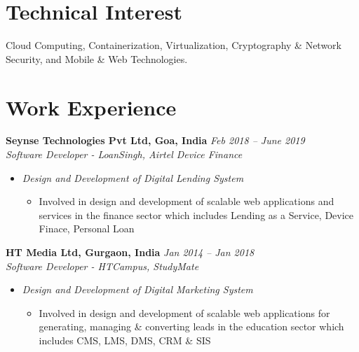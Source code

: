 \documentclass[margin,line]{resume}
\begin{document}
\begin{resume}
     \section{\mysidestyle Technical Interest}
        Cloud Computing, Containerization, Virtualization, Cryptography \& Network Security, and Mobile \& Web Technologies.

    \section{\mysidestyle Work Experience}

    \textbf{Seynse Technologies Pvt Ltd, Goa, India} \hfill \textsl{Feb 2018 -- June 2019} \vspace{0mm}\\\vspace{0mm}%
           \textsl{Software Developer - LoanSingh, Airtel Device Finance}\\
    \begin{itemize}
    
     \item \textsl{Design and Development of Digital Lending System}
        \begin{itemize}
            \item Involved in design and development of scalable web applications and services in the finance sector which includes
            Lending as a Service, Device Finace, Personal Loan
        \end{itemize}
    \end{itemize}

    \textbf{HT Media Ltd, Gurgaon, India} \hfill \textsl{Jan 2014 -- Jan 2018} \vspace{0mm}\\\vspace{0mm}%
           \textsl{Software Developer - HTCampus, StudyMate}\\
    \begin{itemize}
    
     \item \textsl{Design and Development of Digital Marketing System}
        \begin{itemize}
            \item Involved in design and development of scalable web applications for generating, managing \& converting leads
            in the education sector which includes CMS, LMS, DMS, CRM \& SIS
        \end{itemize}
   \end{itemize}


\end{resume}
\end{document}
